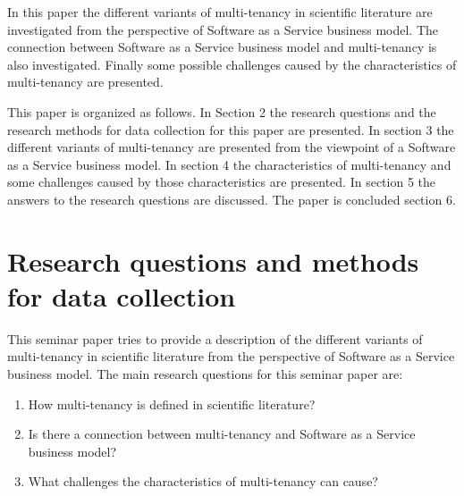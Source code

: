 \documentclass[conference]{sasmoota2017}
\begin{document}
In this paper the different variants of multi-tenancy in scientific literature are investigated from the perspective of Software as a Service business model. The connection between Software as a Service business model and multi-tenancy is also investigated. Finally some possible challenges caused by the characteristics of multi-tenancy are presented.

This paper is organized as follows. In Section 2 the research questions and the research methods for data collection for this paper are presented. In section 3 the different variants of multi-tenancy are presented from the viewpoint of a Software as a Service business model. In section 4 the characteristics of multi-tenancy and some challenges caused by those characteristics are presented. In section 5 the answers to the research questions are discussed. The paper is concluded section 6. 








\section{Research questions and methods for data collection}

This seminar paper tries to provide a description of the different variants of multi-tenancy in scientific literature from the perspective of Software as a Service business model. The main research questions for this seminar paper are: 
\begin{enumerate}
\item How multi-tenancy is defined in scientific literature?
\item Is there a connection between multi-tenancy and Software as a Service business model?
\item What challenges the characteristics of multi-tenancy can cause?
\end{enumerate}
\end{document}
